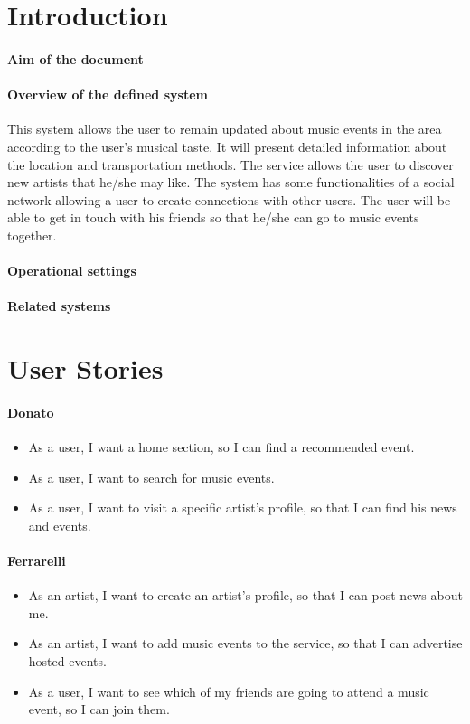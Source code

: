 \documentclass[11pt,a4paper]{article}
\begin{document}
\section{Introduction}
\paragraph{Aim of the document}
\paragraph{Overview of the defined system}
This system allows the user to remain updated about music events in the area according to the user’s musical taste. It will present detailed information about the location and transportation methods. The service allows the user to discover new artists that he/she may like. The system has some functionalities of a social network allowing a user to create connections with other users. The user will be able to get in touch with his friends so that he/she can go to music events together.
\paragraph{Operational settings}
\paragraph{Related systems}
\section{User Stories}
\paragraph{Donato}
\begin{itemize}
\item As a user, I want a home section, so I can find a recommended event. 
\item As a user, I want to search for music events.
\item As a user, I want to visit a specific artist’s profile, so that I can find his news and events.
\end{itemize}
\paragraph{Ferrarelli}
\begin{itemize}
\item As an artist, I want to create an artist’s profile, so that I can post news about me.
\item As an artist, I want to add music events to the service, so that I can advertise hosted events.
\item As a user, I want to see which of my friends are going to attend a music event, so I can join them.
\end{itemize}
\end{document}

